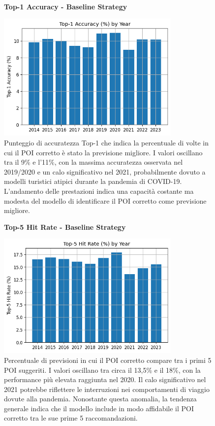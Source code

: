 \begin{itemize}
\begin{enumerate}
\begin{figure}[H]
\centering
\textbf{Top-1 Accuracy - Baseline Strategy}\par
\vspace{0.5em}
\includegraphics[width=0.8\textwidth]{../../img/no_SPACE-GEO_n-1_come_current_POI/top1_accuracy.png}
\caption{Punteggio di accuratezza Top-1 che indica la percentuale di volte in cui il POI corretto è stato la previsione migliore. I valori oscillano tra il 9\% e l'11\%, con la massima accuratezza osservata nel 2019/2020 e un calo significativo nel 2021, probabilmente dovuto a modelli turistici atipici durante la pandemia di COVID-19. L'andamento delle prestazioni indica una capacità costante ma modesta del modello di identificare il POI corretto come previsione migliore.}
\label{fig:baseline_top1}
\end{figure}

\begin{figure}[H]
\centering
\textbf{Top-5 Hit Rate - Baseline Strategy}\par
\vspace{0.5em}
\includegraphics[width=0.8\textwidth]{../../img/no_SPACE-GEO_n-1_come_current_POI/top5_hit_rate.png}
\caption{Percentuale di previsioni in cui il POI corretto compare tra i primi 5 POI suggeriti. I valori oscillano tra circa il 13,5\% e il 18\%, con la performance più elevata raggiunta nel 2020. Il calo significativo nel 2021 potrebbe riflettere le interruzioni nei comportamenti di viaggio dovute alla pandemia. Nonostante questa anomalia, la tendenza generale indica che il modello include in modo affidabile il POI corretto tra le sue prime 5 raccomandazioni.}
\label{fig:baseline_top5}
\end{figure}


\end{enumerate}
\end{itemize}
